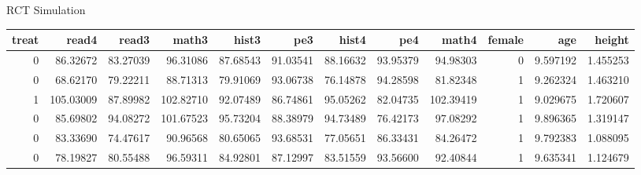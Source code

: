\documentclass[
  ignorenonframetext,
]{beamer}
\newenvironment{Shaded}{\begin{snugshade}}{\end{snugshade}}
\newcommand{\CommentTok}[1]{\textcolor[rgb]{0.56,0.35,0.01}{\textit{#1}}}
\newcommand{\DecValTok}[1]{\textcolor[rgb]{0.00,0.00,0.81}{#1}}
\newcommand{\FloatTok}[1]{\textcolor[rgb]{0.00,0.00,0.81}{#1}}
\newcommand{\KeywordTok}[1]{\textcolor[rgb]{0.13,0.29,0.53}{\textbf{#1}}}
\newcommand{\NormalTok}[1]{#1}
\newcommand{\OperatorTok}[1]{\textcolor[rgb]{0.81,0.36,0.00}{\textbf{#1}}}
\newcommand{\StringTok}[1]{\textcolor[rgb]{0.31,0.60,0.02}{#1}}
\begin{document}
\begin{frame}[fragile]{RCT Simulation}
\begin{Shaded}
\end{Shaded}

\begin{longtable}[]{@{}rrrrrrrrrrrr@{}}
\toprule
treat & read4 & read3 & math3 & hist3 & pe3 & hist4 & pe4 & math4 &
female & age & height\tabularnewline
\midrule
\endhead
0 & 86.32672 & 83.27039 & 96.31086 & 87.68543 & 91.03541 & 88.16632 &
93.95379 & 94.98303 & 0 & 9.597192 & 1.455253\tabularnewline
0 & 68.62170 & 79.22211 & 88.71313 & 79.91069 & 93.06738 & 76.14878 &
94.28598 & 81.82348 & 1 & 9.262324 & 1.463210\tabularnewline
1 & 105.03009 & 87.89982 & 102.82710 & 92.07489 & 86.74861 & 95.05262 &
82.04735 & 102.39419 & 1 & 9.029675 & 1.720607\tabularnewline
0 & 85.69802 & 94.08272 & 101.67523 & 95.73204 & 88.38979 & 94.73489 &
76.42173 & 97.08292 & 1 & 9.896365 & 1.319147\tabularnewline
0 & 83.33690 & 74.47617 & 90.96568 & 80.65065 & 93.68531 & 77.05651 &
86.33431 & 84.26472 & 1 & 9.792383 & 1.088095\tabularnewline
0 & 78.19827 & 80.55488 & 96.59311 & 84.92801 & 87.12997 & 83.51559 &
93.56600 & 92.40844 & 1 & 9.635341 & 1.124679\tabularnewline
\bottomrule
\end{longtable}
\end{frame}
\end{document}
